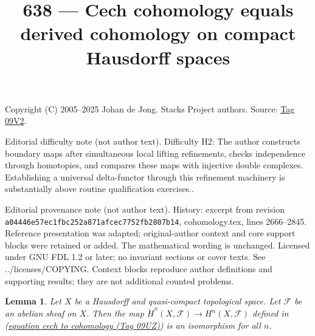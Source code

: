 \documentclass{amsart}
\theoremstyle{plain}
\newtheorem{lemma}[subsection]{Lemma}
\theoremstyle{definition}
\theoremstyle{remark}
\numberwithin{equation}{subsection}
\begin{document}
\title[Stacks Project, Tag 09V2]{638 --- Cech cohomology equals derived cohomology on compact Hausdorff spaces}
\maketitle
\noindent Copyright (C) 2005--2025 Johan de Jong. Stacks Project authors. Source: \href{https://stacks.math.columbia.edu/tag/09V2}{Tag 09V2}.

\noindent Editorial difficulty note (not author text). Difficulty H2: The author constructs boundary maps after simultaneous local lifting refinements, checks independence through homotopies, and compares these maps with injective double complexes. Establishing a universal delta-functor through this refinement machinery is substantially above routine qualification exercises..

\noindent Editorial provenance note (not author text). History: excerpt from revision \texttt{a0444\allowbreak 6e57e\allowbreak c1fbc\allowbreak 252a8\allowbreak 71afc\allowbreak ec775\allowbreak 2fb28\allowbreak 07b14}, cohomology.tex, lines 2666--2845. Reference presentation was adapted; original-author context and core support blocks were retained or added. The mathematical wording is unchanged. Licensed under GNU FDL 1.2 or later; no invariant sections or cover texts. See ../licenses/COPYING. Context blocks reproduce author definitions and supporting results; they are not additional counted problems.

\begin{lemma}
\label{lemma-cech-Hausdorff-quasi-compact}
Let $X$ be a Hausdorff and quasi-compact topological space. Let
$\mathcal{F}$ be an abelian sheaf on $X$. Then
the map $\check{H}^n(X, \mathcal{F}) \to H^n(X, \mathcal{F})$ defined
in (\href{https://stacks.math.columbia.edu/tag/09UZ}{equation cech to cohomology (Tag 09UZ)}) is an isomorphism for
all $n$.
\end{lemma}
\end{document}

